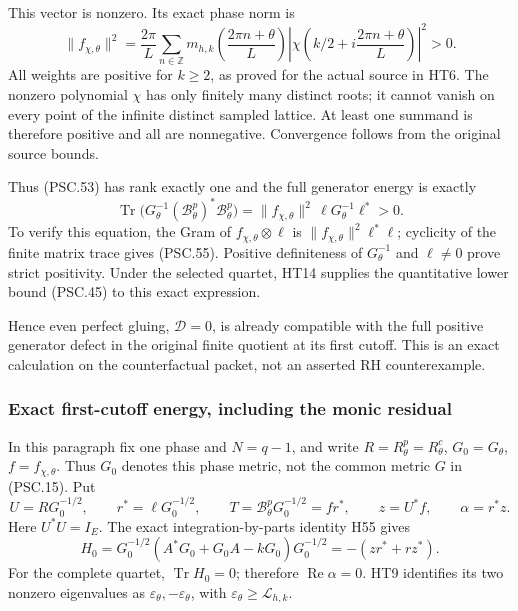 This vector is nonzero. Its exact phase norm is
\[
 \|f_{\chi,\theta}\|^2
 =\frac{2\pi}{L}\sum_{n\in\mathbb Z}
   m_{h,k}\!\left(\frac{2\pi n+\theta}{L}\right)
   \left|\chi\!\left(k/2+i\frac{2\pi n+\theta}{L}\right)\right|^2>0.
 \tag{PSC.54}
\]
All weights are positive for \(k\geq2\), as proved for the actual source in HT6. The nonzero polynomial \(\chi\) has only finitely many distinct roots; it cannot vanish on every point of the infinite distinct sampled lattice. At least one summand is therefore positive and all are nonnegative. Convergence follows from the original source bounds.

Thus (PSC.53) has rank exactly one and the full generator energy is exactly
\[
 \operatorname{Tr}\bigl(
    G_\theta^{-1}(\mathscr B^p_\theta)^*\mathscr B^p_\theta\bigr)
 =\|f_{\chi,\theta}\|^2\,\ell G_\theta^{-1}\ell^*>0.
 \tag{PSC.55}
\]
To verify this equation, the Gram of \(f_{\chi,\theta}\otimes\ell\) is
\(\|f_{\chi,\theta}\|^2\ell^*\ell\); cyclicity of the finite matrix trace gives (PSC.55). Positive definiteness of \(G_\theta^{-1}\) and \(\ell\ne0\) prove strict positivity. Under the selected quartet, HT14 supplies the quantitative lower bound (PSC.45) to this exact expression.

Hence even perfect gluing, \(\mathscr D=0\), is already compatible with the full positive generator defect in the original finite quotient at its first cutoff. This is an exact calculation on the counterfactual packet, not an asserted RH counterexample.

\subsubsection{Exact first-cutoff energy, including the monic residual}

In this paragraph fix one phase and \(N=q-1\), and write
\(R=R^p_\theta=R^c_\theta\), \(G_0=G_\theta\),
\(f=f_{\chi,\theta}\). Thus \(G_0\) denotes this phase metric, not the common metric \(G\) in (PSC.15). Put
\[
 U=RG_0^{-1/2},\qquad
 r^*=\ell G_0^{-1/2},\qquad
 T=\mathscr B^p_\theta G_0^{-1/2}=fr^*,\qquad
 z=U^*f,\qquad \alpha=r^*z.
 \tag{PSC.56}
\]
Here \(U^*U=I_E\). The exact integration-by-parts identity H55 gives
\[
 H_0=G_0^{-1/2}(A^*G_0+G_0A-kG_0)G_0^{-1/2}
 =-(zr^*+rz^*).
 \tag{PSC.57}
\]
For the complete quartet, \(\operatorname{Tr}H_0=0\); therefore
\(\operatorname{Re}\alpha=0\). HT9 identifies its two nonzero eigenvalues as \(\varepsilon_\theta,-\varepsilon_\theta\), with \(\varepsilon_\theta\geq\mathcal L_{h,k}\).

